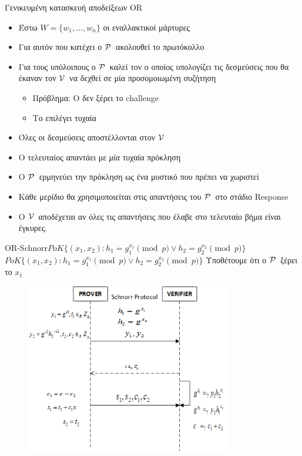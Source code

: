 \documentclass[10pt,handout]{beamer}
\begin{document}
\begin{frame}{Γενικευμένη κατασκευή αποδείξεων OR}
\begin{itemize}
	\item Έστω $W = \{w_1, ..., w_n\}$ οι εναλλακτικοί μάρτυρες
	\pause
	\item Για αυτόν που κατέχει ο $\mathcal{P}\,$ ακολουθεί το πρωτόκολλο
	\pause
	\item Για τους υπόλοιπους ο $\mathcal{P}\,$ καλεί τον \siml ο οποίος υπολογίζει τις δεσμεύσεις που θα έκαναν τον $\mathcal{V}\,$ να δεχθεί σε μία προσομοιωμένη συζήτηση
	\pause
	\begin{itemize}
		\item \alert{Πρόβλημα:} O \siml δεν ξέρει το challenge
		\item {} Το επιλέγει τυχαία
	\end{itemize} 
	\item Όλες οι δεσμεύσεις αποστέλλονται στον $\mathcal{V}\,$ 
	\pause
	\item Ο τελευταίος απαντάει με \emph{μία} τυχαία πρόκληση
	\pause
	\item O $\mathcal{P}\,$ ερμηνεύει την πρόκληση ως ένα μυστικό που πρέπει να χωριστεί
	\pause
	\item Κάθε μερίδιο θα χρησιμοποιείται στις απαντήσεις του $\mathcal{P}\,$ στο στάδιο Response
	\pause
	\item Ο $\mathcal{V}\,$ αποδέχεται αν όλες τις απαντήσεις που έλαβε στο τελευταίο βήμα είναι έγκυρες.
\end{itemize}
\end{frame}

\begin{frame}{OR-Schnorr}{$PoK \{(x_1,x_2): h_1 = g_1^{x_1} \pmod{p} \vee h_2 = g_2^{x_2} \pmod{p}  \}$ }
	$PoK \{(x_1,x_2): h_1 = g_1^{x_1} \pmod{p} \vee h_2 = g_2^{x_2} \pmod{p}  \}$
	Υποθέτουμε ότι ο $\mathcal{P}\,$ ξέρει το $x_1$
\begin{figure}
	\centering
	\includegraphics[width=0.8\textwidth]{schnorrwid.png}
\end{figure}
\end{frame}
\end{document}
